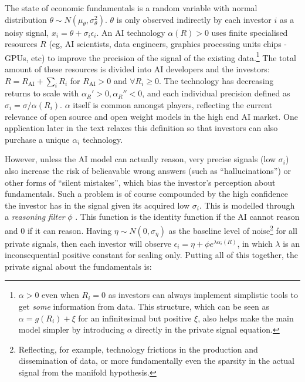 \documentclass[
]{article}
\theoremstyle{plain}
\theoremstyle{definition}
\theoremstyle{remark}
\begin{document}
The state of economic fundamentals is a random variable with normal
distribution \(\theta \sim N(\mu_\theta, \sigma_\theta^2)\). \(\theta\)
is only observed indirectly by each investor \(i\) as a noisy signal,
\(x_i = \theta + \sigma_i \epsilon_i\). An AI technology
\(\alpha(R) > 0\) uses finite specialised resources \(R\) (eg, AI
scientists, data engineers, graphics processing units chips - GPUs, etc)
to improve the precision of the signal of the existing data.\footnote{\(\alpha > 0\)
  even when \(R_i = 0\) as investors can always implement simplistic
  tools to get \emph{some} information from data. This structure, which
  can be seen as \(\alpha = g(R_i) + \xi\) for an infinitesimal but
  positive \(\xi\), also helps make the main model simpler by
  introducing \(\alpha\) directly in the private signal equation.} The
total amount of these resources is divided into AI developers and the
investors: \(R = R_{\text{AI}} + \sum_{i} R_i\) for
\(R_{\text{AI}} > 0\) and \(\forall R_i \geq 0\). The technology has
decreasing returns to scale with \(\alpha_R' > 0, \alpha_R'' < 0\), and
each individual precision defined as
\(\sigma_i = \sigma / \alpha(R_i)\). \(\alpha\) itself is common amongst
players, reflecting the current relevance of open source and open weight
models in the high end AI market. One application later in the text
relaxes this definition so that investors can also purchase a unique
\(\alpha_i\) technology.

However, unless the AI model can actually reason, very precise signals
(low \(\sigma_i\)) also increase the risk of belieavable wrong answers
(such as ``hallucinations'') or other forms of ``silent mistakes'',
which bias the investor's perception about fundamentals. Such a problem
is of course compounded by the high confidence the investor has in the
signal given its acquired low \(\sigma_i\). This is modelled through a
\emph{reasoning filter} \(\phi\) . This function is the identity
function if the AI cannot reason and 0 if it can reason. Having
\(\eta \sim N(0, \sigma_\eta)\) as the baseline level of
noise\footnote{Reflecting, for example, technology frictions in the
  production and dissemination of data, or more fundamentally even the
  sparsity in the actual signal from the manifold hypothesis.} for all
private signals, then each investor will observe
\(\epsilon_i = \eta + \phi e^{\lambda \alpha_i(R)}\), in which
\(\lambda\) is an inconsequential positive constant for scaling only.
Putting all of this together, the private signal about the fundamentals
is:
\end{document}
